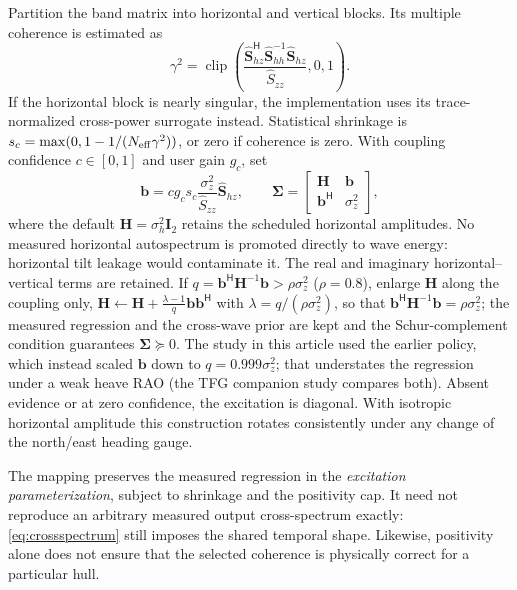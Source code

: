 \documentclass[conference]{IEEEtran}
\newcommand{\vc}[1]{\bm{#1}}
\newcommand{\mt}[1]{\bm{#1}}
\newcommand{\herm}{^{\mathsf H}}
\DeclareMathOperator{\clip}{clip}
\begin{document}
Partition the band matrix into horizontal and vertical blocks. Its
multiple coherence is estimated as
\begin{equation}
 \gamma^2=\clip\!\left(
 \frac{\hat{\vc S}_{hz}\herm\hat{\mt S}_{hh}^{-1}
                         \hat{\vc S}_{hz}}{\hat S_{zz}},0,1\right).
 \label{eq:coherence}
\end{equation}
If the horizontal block is nearly singular, the implementation uses its
trace-normalized cross-power surrogate instead. Statistical shrinkage is
$s_c=\max(0,1-1/(N_{\rm eff}\gamma^2))$, or zero if coherence is zero.
With coupling confidence $c\in[0,1]$ and user gain $g_c$, set
\begin{equation}
 \vc b=cg_cs_c\frac{\sigma_z^2}{\hat S_{zz}}\hat{\vc S}_{hz},\qquad
 \mt\Sigma=\begin{bmatrix}\mt H&\vc b\\\vc b\herm&\sigma_z^2\end{bmatrix},
 \label{eq:excitation}
\end{equation}
where the default $\mt H=\sigma_h^2\mt I_2$ retains the scheduled
horizontal amplitudes. No measured horizontal autospectrum is promoted
directly to wave energy: horizontal tilt leakage would contaminate it.
The real and imaginary horizontal--vertical terms are retained.
If $q=\vc b\herm\mt H^{-1}\vc b>\rho\sigma_z^2$ ($\rho=0.8$), enlarge
$\mt H$ along the coupling only,
$\mt H\leftarrow\mt H+\frac{\lambda-1}{q}\vc b\vc b\herm$ with
$\lambda=q/(\rho\sigma_z^2)$, so that $\vc b\herm\mt H^{-1}\vc b=\rho\sigma_z^2$;
the measured regression and the cross-wave prior are kept and the
Schur-complement condition guarantees $\mt\Sigma\succeq0$. The study in this
article used the earlier policy, which instead scaled $\vc b$ down to
$q=0.999\sigma_z^2$; that understates the regression under a weak heave RAO
(the TFG companion study compares both). Absent evidence or at zero confidence, the excitation
is diagonal. With isotropic horizontal amplitude this construction
rotates consistently under any change of the north/east heading gauge.

The mapping preserves the measured regression in the \emph{excitation
parameterization}, subject to shrinkage and the positivity cap. It need
not reproduce an arbitrary measured output cross-spectrum exactly:
\cref{eq:crossspectrum} still imposes the shared temporal shape.
Likewise, positivity alone does not ensure that the selected coherence is
physically correct for a particular hull.
\end{document}
